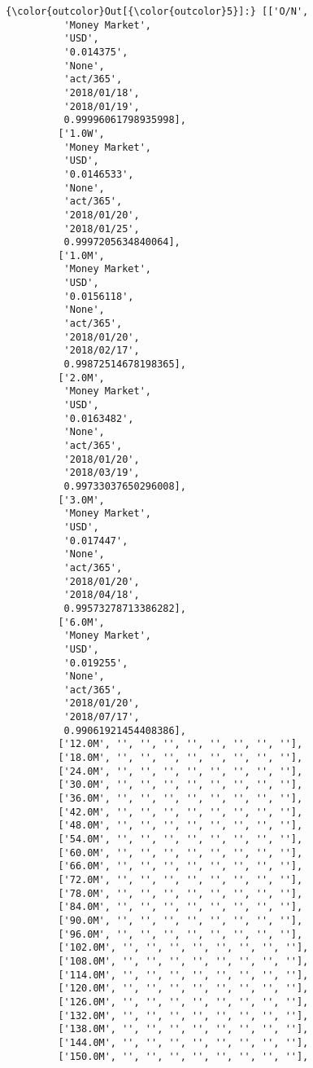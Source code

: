 \documentclass[11pt]{article}
\begin{document}
\begin{Verbatim}[commandchars=\\\{\}]
{\color{outcolor}Out[{\color{outcolor}5}]:} [['O/N',
          'Money Market',
          'USD',
          '0.014375',
          'None',
          'act/365',
          '2018/01/18',
          '2018/01/19',
          0.99996061798935998],
         ['1.0W',
          'Money Market',
          'USD',
          '0.0146533',
          'None',
          'act/365',
          '2018/01/20',
          '2018/01/25',
          0.9997205634840064],
         ['1.0M',
          'Money Market',
          'USD',
          '0.0156118',
          'None',
          'act/365',
          '2018/01/20',
          '2018/02/17',
          0.99872514678198365],
         ['2.0M',
          'Money Market',
          'USD',
          '0.0163482',
          'None',
          'act/365',
          '2018/01/20',
          '2018/03/19',
          0.99733037650296008],
         ['3.0M',
          'Money Market',
          'USD',
          '0.017447',
          'None',
          'act/365',
          '2018/01/20',
          '2018/04/18',
          0.99573278713386282],
         ['6.0M',
          'Money Market',
          'USD',
          '0.019255',
          'None',
          'act/365',
          '2018/01/20',
          '2018/07/17',
          0.99061921454408386],
         ['12.0M', '', '', '', '', '', '', '', ''],
         ['18.0M', '', '', '', '', '', '', '', ''],
         ['24.0M', '', '', '', '', '', '', '', ''],
         ['30.0M', '', '', '', '', '', '', '', ''],
         ['36.0M', '', '', '', '', '', '', '', ''],
         ['42.0M', '', '', '', '', '', '', '', ''],
         ['48.0M', '', '', '', '', '', '', '', ''],
         ['54.0M', '', '', '', '', '', '', '', ''],
         ['60.0M', '', '', '', '', '', '', '', ''],
         ['66.0M', '', '', '', '', '', '', '', ''],
         ['72.0M', '', '', '', '', '', '', '', ''],
         ['78.0M', '', '', '', '', '', '', '', ''],
         ['84.0M', '', '', '', '', '', '', '', ''],
         ['90.0M', '', '', '', '', '', '', '', ''],
         ['96.0M', '', '', '', '', '', '', '', ''],
         ['102.0M', '', '', '', '', '', '', '', ''],
         ['108.0M', '', '', '', '', '', '', '', ''],
         ['114.0M', '', '', '', '', '', '', '', ''],
         ['120.0M', '', '', '', '', '', '', '', ''],
         ['126.0M', '', '', '', '', '', '', '', ''],
         ['132.0M', '', '', '', '', '', '', '', ''],
         ['138.0M', '', '', '', '', '', '', '', ''],
         ['144.0M', '', '', '', '', '', '', '', ''],
         ['150.0M', '', '', '', '', '', '', '', ''],

\end{Verbatim}
\end{document}
